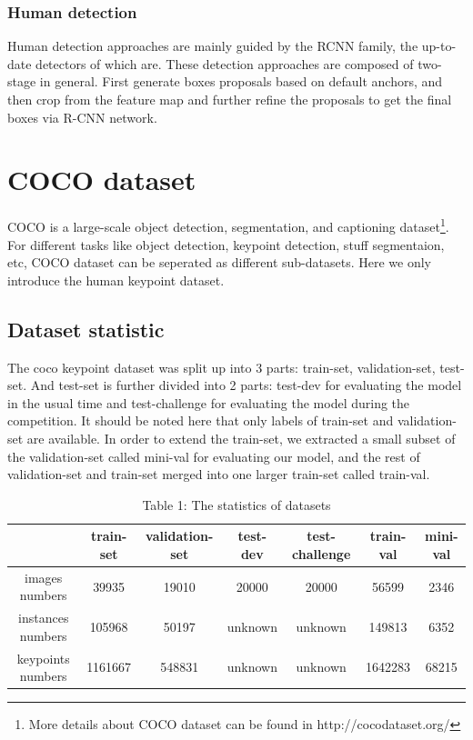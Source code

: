 \subsubsection{Human detection}
Human detection approaches are mainly guided by the RCNN family\cite{girshick2014rich, girshick2015fast, ren2015faster}, the up-to-date detectors of which are\cite{lin2017feature, he2017mask}.
These detection approaches are composed of two-stage in general.
First generate boxes proposals based on default anchors, and then crop from the feature map and further refine the proposals to get the final boxes via R-CNN network.


\section{COCO dataset}

COCO\cite{lin2014microsoft} is a large-scale object detection, segmentation, and captioning dataset\footnote{More details about COCO dataset can be found in http://cocodataset.org/}.
For different tasks like object detection, keypoint detection, stuff segmentaion, etc, COCO dataset can be seperated as different sub-datasets.
Here we only introduce the human keypoint dataset.


\subsection{Dataset statistic}
The coco keypoint dataset was split up into 3 parts: train-set, validation-set, test-set.
And test-set is further divided into 2 parts: test-dev for evaluating the model in the usual time and test-challenge for evaluating the model during the competition.
It should be noted here that only labels of train-set and validation-set are available.
In order to extend the train-set, we extracted a small subset of the validation-set called mini-val for evaluating our model,
and the rest of validation-set and train-set merged into one larger train-set called train-val.

\captionsetup[table]{labelformat=empty}
\begin{table}[!hbp]
  \centering
  \begin{tabular}{|c|c|c|c|c|c|c|}
  \hline
            & train-set & validation-set & test-dev & test-challenge & train-val & mini-val \\
  \hline
  images numbers & 39935 & 19010 & 20000 & 20000 & 56599 & 2346\\
  \hline
  instances numbers & 105968 & 50197 & unknown & unknown & 149813 & 6352\\
  \hline
  keypoints numbers & 1161667  & 548831 & unknown & unknown & 1642283 & 68215\\
  \hline
  \end{tabular}
  \caption{Table 1: The statistics of datasets}
\end{table}

